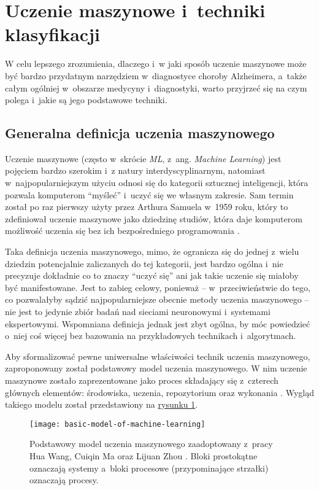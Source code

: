 {\section{Uczenie maszynowe i~techniki klasyfikacji}

W celu lepszego zrozumienia, dlaczego i~w jaki sposób uczenie maszynowe może być bardzo przydatnym narzędziem w~diagnostyce choroby Alzheimera, a~także całym ogólniej w~obszarze medycyny i~diagnostyki, warto przyjrzeć się na czym polega i~jakie są jego podstawowe techniki.

\subsection{Generalna definicja uczenia maszynowego}

Uczenie maszynowe (często w~skrócie \emph{ML}, z~ang. \emph{Machine Learning}) jest pojęciem bardzo szerokim i~z natury interdyscyplinarnym, natomiast w~najpopularniejszym użyciu odnosi się do kategorii sztucznej inteligencji, która pozwala komputerom ``myśleć'' i~uczyć się we własnym zakresie.
Sam termin został po raz pierwszy użyty przez Arthura Samuela w~1959 roku, który to zdefiniował uczenie maszynowe jako dziedzinę studiów, która daje komputerom możliwość uczenia się bez ich bezpośredniego programowania \cite{samuel1959some}.

Taka definicja uczenia maszynowego, mimo, że ogranicza się do jednej z~wielu dziedzin potencjalnie zaliczanych do tej kategorii, jest bardzo ogólna i~nie precyzuje dokładnie co to znaczy ``uczyć się'' ani jak takie uczenie się miałoby być manifestowane.
Jest to zabieg celowy, ponieważ -- w~przeciwieństwie do tego, co pozwalałyby sądzić najpopularniejsze obecnie metody uczenia maszynowego -- nie jest to jedynie zbiór badań nad sieciami neuronowymi i~systemami ekspertowymi.
Wspomniana definicja jednak jest zbyt ogólna, by móc powiedzieć o~niej coś więcej bez bazowania na przykładowych technikach i~algorytmach.

Aby sformalizować pewne uniwersalne właściwości technik uczenia maszynowego, zaproponowany został podstawowy model uczenia maszynowego.
W nim uczenie maszynowe zostało zaprezentowane jako proces składający się z~czterech głównych elementów: środowiska, uczenia, repozytorium oraz wykonania \cite{wang2009brief}.
Wygląd takiego modelu został przedstawiony na \hyperref[fig:basic-model-of-machine-learning]{rysunku \ref*{fig:basic-model-of-machine-learning}}.

\begin{figure}[ht]
  \texttt{[image: basic-model-of-machine-learning]}
  \caption[Podstawowy model uczenia maszynowego]{Podstawowy model uczenia maszynowego zaadoptowany z~pracy Hua Wang, Cuiqin Ma oraz Lijuan Zhou \cite{wang2009brief}. Bloki prostokątne oznaczają systemy a~bloki procesowe (przypominające strzałki) oznaczają procesy.}
  \label{fig:basic-model-of-machine-learning}
\end{figure}

}
